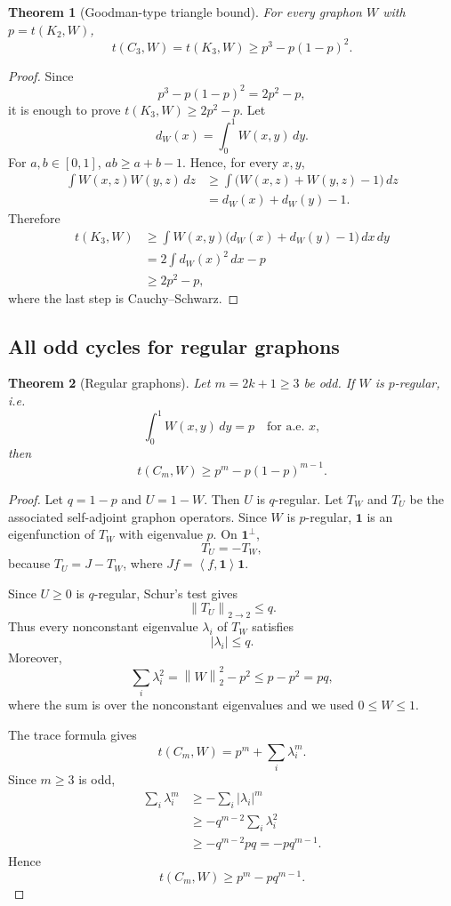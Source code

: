 \documentclass[11pt]{article}
\newtheorem{theorem}{Theorem}[section]
\newcommand{\one}{\mathbf 1}
\newcommand{\ip}[2]{\left\langle #1,#2\right\rangle}
\newcommand{\norm}[1]{\left\|#1\right\|}
\begin{document}
\begin{theorem}[Goodman-type triangle bound]\label{thm:C3}
For every graphon $W$ with $p=t(K_2,W)$,
\[
        t(C_3,W)=t(K_3,W)\ge p^3-p(1-p)^2.
\]
\end{theorem}

\begin{proof}
Since
\[
        p^3-p(1-p)^2=2p^2-p,
\]
it is enough to prove $t(K_3,W)\ge 2p^2-p$.
Let
\[
        d_W(x)=\int_0^1 W(x,y)\,dy.
\]
For $a,b\in[0,1]$, $ab\ge a+b-1$.  Hence, for every $x,y$,
\[
\begin{aligned}
    \int W(x,z)W(y,z)\,dz
    &\ge \int\bigl(W(x,z)+W(y,z)-1\bigr)\,dz\\
    &=d_W(x)+d_W(y)-1.
\end{aligned}
\]
Therefore
\[
\begin{aligned}
    t(K_3,W)
    &\ge \int W(x,y)\bigl(d_W(x)+d_W(y)-1\bigr)\,dx\,dy\\
    &=2\int d_W(x)^2\,dx-p\\
    &\ge 2p^2-p,
\end{aligned}
\]
where the last step is Cauchy--Schwarz.
\end{proof}

\subsection{All odd cycles for regular graphons}\label{subsec:regular}

\begin{theorem}[Regular graphons]\label{thm:regular}
Let $m=2k+1\ge3$ be odd.  If $W$ is $p$-regular, i.e.
\[
        \int_0^1 W(x,y)\,dy=p\quad\text{for a.e. }x,
\]
then
\[
        t(C_m,W)\ge p^m-p(1-p)^{m-1}.
\]
\end{theorem}

\begin{proof}
Let $q=1-p$ and $U=1-W$.  Then $U$ is $q$-regular.  Let $T_W$ and $T_U$ be the associated self-adjoint graphon operators.  Since $W$ is $p$-regular, $\one$ is an eigenfunction of $T_W$ with eigenvalue $p$.  On $\one^\perp$,
\[
        T_U=-T_W,
\]
because $T_U=J-T_W$, where $Jf=\ip{f}{\one}\one$.

Since $U\ge0$ is $q$-regular, Schur's test gives
\[
        \norm{T_U}_{2\to2}\le q.
\]
Thus every nonconstant eigenvalue $\lambda_i$ of $T_W$ satisfies
\[
        |\lambda_i|\le q.
\]
Moreover,
\[
        \sum_i \lambda_i^2
        =\norm{W}_2^2-p^2
        \le p-p^2=pq,
\]
where the sum is over the nonconstant eigenvalues and we used $0\le W\le1$.

The trace formula gives
\[
        t(C_m,W)=p^m+\sum_i \lambda_i^m.
\]
Since $m\ge3$ is odd,
\[
\begin{aligned}
        \sum_i\lambda_i^m
        &\ge -\sum_i |\lambda_i|^m\\
        &\ge -q^{m-2}\sum_i\lambda_i^2\\
        &\ge -q^{m-2}pq=-pq^{m-1}.
\end{aligned}
\]
Hence
\[
        t(C_m,W)\ge p^m-pq^{m-1}.
\]
\end{proof}
\end{document}
